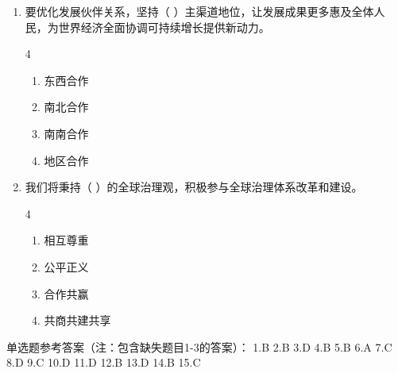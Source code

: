 \documentclass[a4paper,11pt]{ctexart}
\begin{document}
\begin{enumerate}[start=4]
    \item 要优化发展伙伴关系，坚持（ ）主渠道地位，让发展成果更多惠及全体人民，为世界经济全面协调可持续增长提供新动力。
    \begin{multicols}{4}
    \begin{enumerate}
        \item 东西合作
        \item 南北合作
        \item 南南合作
        \item 地区合作
    \end{enumerate}
    \end{multicols}

    \item 我们将秉持（ ）的全球治理观，积极参与全球治理体系改革和建设。
    \begin{multicols}{4}
    \begin{enumerate}
        \item 相互尊重
        \item 公平正义
        \item 合作共赢
        \item 共商共建共享
    \end{enumerate}
    \end{multicols}
\end{enumerate}

\begin{answerbox}
单选题参考答案（注：包含缺失题目1-3的答案）：
1.B \quad 2.B \quad 3.D \quad 4.B \quad 5.B \quad 6.A \quad 7.C \quad 8.D \quad 9.C \quad 10.D \quad 11.D \quad 12.B \quad 13.D \quad 14.B \quad 15.C
\end{answerbox}
\end{document}
